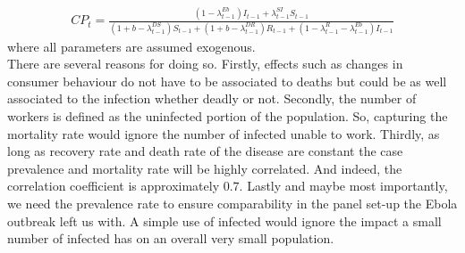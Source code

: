 \documentclass{article}
\begin{document}
\begin{align*}
CP_t = \frac{(1 - \lambda^{Eb}_{t-1})I_{t-1} + \lambda_{t-1}^{SI} S_{t-1} }{(1+b-\lambda_{t-1}^{DS})S_{t-1} + (1+b-\lambda_{t-1}^{DR})R_{t-1} + (1 - \lambda_{t-1}^{R}- \lambda_{t-1}^{Eb})I_{t-1}}
\end{align*}
where all parameters are assumed exogenous.\\
There are several reasons for doing so. Firstly, effects such as changes in consumer behaviour do not have to be associated to deaths but could be as well associated to the infection whether deadly or not. Secondly, the number of workers is defined as the uninfected portion of the population. So, capturing the mortality rate would ignore the number of infected unable to work. Thirdly, as long as recovery rate and death rate of the disease are constant the case prevalence and mortality rate will be highly correlated. And indeed, the correlation coefficient is approximately $0.7$. Lastly and maybe most importantly, we need the prevalence rate to ensure comparability in the panel set-up the Ebola outbreak left us with. A simple use of infected would ignore the impact a small number of infected has on an overall very small population. \\
\end{document}
